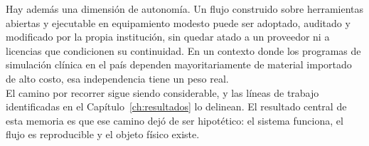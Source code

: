 Hay además una dimensión de autonomía. Un flujo construido sobre herramientas abiertas y ejecutable en equipamiento modesto puede ser adoptado, auditado y modificado por la propia institución, sin quedar atado a un proveedor ni a licencias que condicionen su continuidad. En un contexto donde los programas de simulación clínica en el país dependen mayoritariamente de material importado de alto costo, esa independencia tiene un peso real.\\

El camino por recorrer sigue siendo considerable, y las líneas de trabajo identificadas en el Capítulo~\ref{ch:resultados} lo delinean. El resultado central de esta memoria es que ese camino dejó de ser hipotético: el sistema funciona, el flujo es reproducible y el objeto físico existe.\\